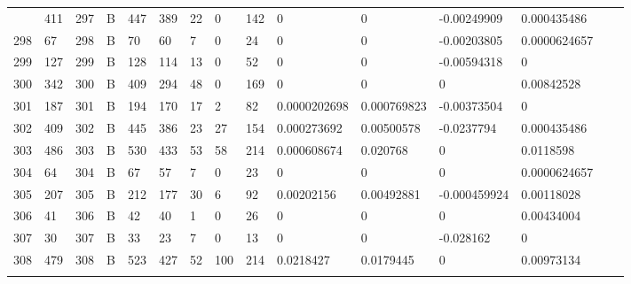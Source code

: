 \begin{longtable}{lllllllllllllll}
\begin{comment}
	297 & 411               & 297 & B   & 447               & 389               & 22                & 0    & 142        & 0              & 0              & -0.00249909   & 0.000435486  \\
	298 & 67                & 298 & B   & 70                & 60                & 7                 & 0    & 24         & 0              & 0              & -0.00203805   & 0.0000624657 \\
	299 & 127               & 299 & B   & 128               & 114               & 13                & 0    & 52         & 0              & 0              & -0.00594318   & 0            \\
	300 & 342               & 300 & B   & 409               & 294               & 48                & 0    & 169        & 0              & 0              & 0             & 0.00842528   \\
	301 & 187               & 301 & B   & 194               & 170               & 17                & 2    & 82         & 0.0000202698   & 0.000769823    & -0.00373504   & 0            \\
	302 & 409               & 302 & B   & 445               & 386               & 23                & 27   & 154        & 0.000273692    & 0.00500578     & -0.0237794    & 0.000435486  \\
	303 & 486               & 303 & B   & 530               & 433               & 53                & 58   & 214        & 0.000608674    & 0.020768       & 0             & 0.0118598    \\
	304 & 64                & 304 & B   & 67                & 57                & 7                 & 0    & 23         & 0              & 0              & 0             & 0.0000624657 \\
	305 & 207               & 305 & B   & 212               & 177               & 30                & 6    & 92         & 0.00202156     & 0.00492881     & -0.000459924  & 0.00118028   \\
	306 & 41                & 306 & B   & 42                & 40                & 1                 & 0    & 26         & 0              & 0              & 0             & 0.00434004   \\
	307 & 30                & 307 & B   & 33                & 23                & 7                 & 0    & 13         & 0              & 0              & -0.028162     & 0            \\
	308 & 479               & 308 & B   & 523               & 427               & 52                & 100  & 214        & 0.0218427      & 0.0179445      & 0             & 0.00973134   \\

\end{comment}
\end{longtable}
